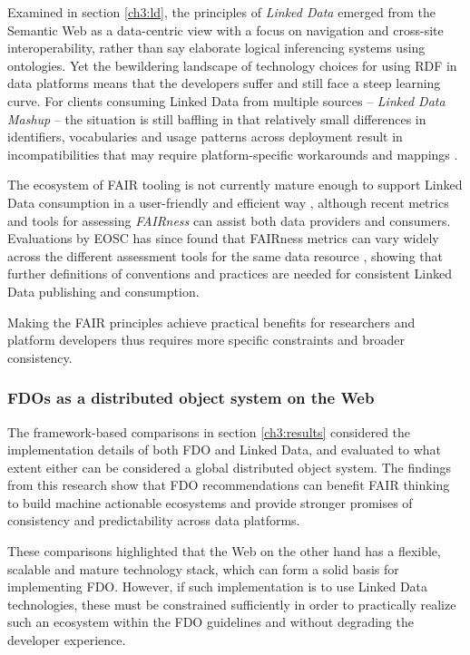 Examined in section \vref{ch3:ld}, the principles of \emph{Linked Data} emerged from the Semantic Web as a data-centric view with a focus on navigation and cross-site interoperability, rather than say elaborate logical inferencing systems using ontologies.  
Yet the bewildering landscape of technology choices for using RDF in data platforms means that the developers suffer and still face a steep learning curve. 
For clients consuming Linked Data from multiple sources -- \emph{Linked Data Mashup} \cite{Tran 2014} -- the situation is still baffling in that relatively small differences in identifiers, vocabularies and usage patterns across deployment result in incompatibilities that may require platform-specific workarounds and mappings \cite{Millard 2010}. 

The ecosystem of FAIR tooling is not currently mature enough to support Linked Data consumption in a user-friendly and efficient way \cite{Thompson 2020}, although recent metrics and tools for assessing \emph{FAIRness} \cite{Wilkinson 2018} can assist both data providers and consumers. 
Evaluations by EOSC has since found that FAIRness metrics can vary widely across the different assessment tools for the same data resource \cite{Wilkinson 2022a}, showing that further definitions of conventions and practices are needed for consistent Linked Data publishing and consumption. 

Making the FAIR principles achieve practical benefits for researchers and platform developers thus requires more specific constraints and broader consistency.

\subsubsection{FDOs as a distributed object system on the Web}
\label{ch61:distributed}

The framework-based comparisons in section \vref{ch3:results} considered the implementation details of both FDO and Linked Data, and evaluated to what extent either can be considered a global distributed object system. 
The findings from this research show that FDO recommendations can benefit FAIR thinking to build machine actionable ecosystems and provide stronger promises of consistency and predictability across data platforms. 

These comparisons highlighted that the Web on the other hand has a flexible, scalable and mature technology stack, which can form a solid basis for implementing FDO. 
However, if such implementation is to use Linked Data technologies, these must be constrained sufficiently in order to practically realize such an ecosystem within the FDO guidelines and without degrading the developer experience.


